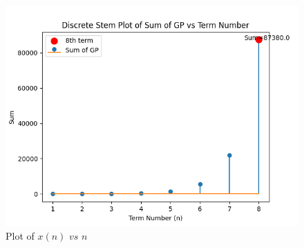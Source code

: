 \documentclass[journal,12pt,twocolumn]{IEEEtran}
\theoremstyle{remark}
\begin{document}
\begin{figure}[ht]
	\centering
    \includegraphics[width=\columnwidth]{figs/figure1.png}
    \caption{Plot of $x(n)$ $vs$ $n$}
    \label{fig: 1}
\end{figure}
\end{document}
